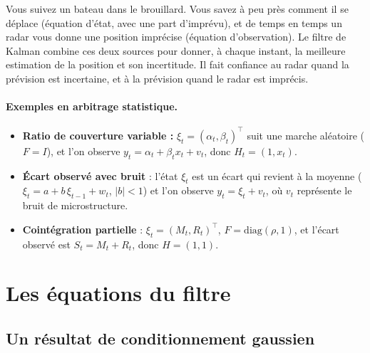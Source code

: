 \begin{intuition}
Vous suivez un bateau dans le brouillard. Vous savez à peu près comment il se déplace (équation d'état, avec une part d'imprévu), et de temps en temps un radar vous donne une position imprécise (équation d'observation). Le filtre de Kalman combine ces deux sources pour donner, à chaque instant, la meilleure estimation de la position et son incertitude. Il fait confiance au radar quand la prévision est incertaine, et à la prévision quand le radar est imprécis.
\end{intuition}

\paragraph{Exemples en arbitrage statistique.}
\begin{itemize}
\item \textbf{Ratio de couverture variable :} $\xi_t = (\alpha_t,\beta_t)^\top$ suit une marche aléatoire ($F = I$), et l'on observe $y_t = \alpha_t + \beta_tx_t + v_t$, donc $H_t = (1, x_t)$.
\item \textbf{Écart observé avec bruit} \citep{elliott2005} : l'état $\xi_t$ est un écart qui revient à la moyenne ($\xi_t = a + b\,\xi_{t-1} + w_t$, $|b|<1$) et l'on observe $y_t = \xi_t + v_t$, où $v_t$ représente le bruit de microstructure.
\item \textbf{Cointégration partielle} \citep{clegg2018} : $\xi_t = (M_t, R_t)^\top$, $F = \mathrm{diag}(\rho,1)$, et l'écart observé est $S_t = M_t + R_t$, donc $H = (1,1)$.
\end{itemize}

\section{Les équations du filtre}

\subsection{Un résultat de conditionnement gaussien}

